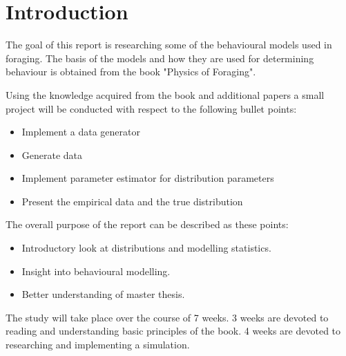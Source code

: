 \chapter{Introduction}
The goal of this report is researching some of the behavioural models used in foraging. The basis of the models and how they are used for determining behaviour is obtained from the book "Physics of Foraging"\cite{viswanathan2011the}.

Using the knowledge acquired from the book and additional papers a small project will be conducted with respect to the following bullet points:
\begin{itemize}
\item Implement a data generator
\item Generate data
\item Implement parameter estimator for distribution parameters
\item Present the empirical data and the true distribution 
\end{itemize}

The overall purpose of the report can be described as these points:
\begin{itemize}
\item Introductory look at distributions and modelling statistics.
\item Insight into behavioural modelling.
\item Better understanding of master thesis.
\end{itemize}

The study will take place over the course of 7 weeks. 3 weeks are devoted to reading and understanding basic principles of the book. 4 weeks are devoted to researching and implementing a simulation.
